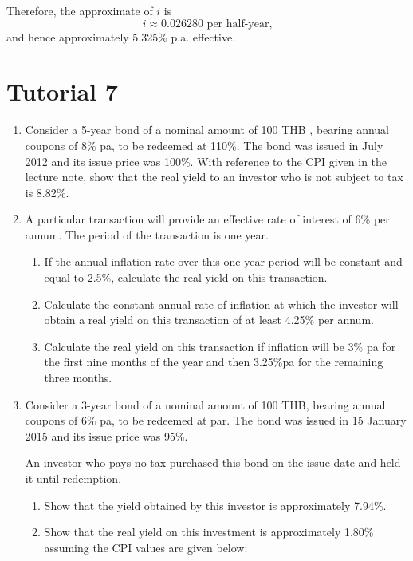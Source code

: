 \documentclass[
]{article}
\theoremstyle{definition}
\theoremstyle{definition}
\theoremstyle{definition}
\theoremstyle{definition}
\theoremstyle{remark}
\begin{document}
Therefore, the approximate of \(i\) is
\[ i \approx 0.026280 \text{ per half-year,} \] and hence
approximately 5.325\% p.a. effective.

\hypertarget{tutorial-7}{%
\section{Tutorial 7}\label{tutorial-7}}

\begin{enumerate}
\def\labelenumi{\arabic{enumi}.}
\item
  Consider a 5-year bond of a nominal amount of 100 THB , bearing annual
  coupons of 8\% pa, to be redeemed at 110\%. The bond was issued in
  July 2012 and its issue price was 100\%. With reference to the CPI
  given in the lecture note, show that the real yield to an investor
  who is not subject to tax is 8.82\%.
\item
  A particular transaction will provide an effective rate of interest
  of 6\% per annum. The period of the transaction is one year.

  \begin{enumerate}
  \def\labelenumii{\arabic{enumii}.}
  \item
    If the annual inflation rate over this one year period will be
    constant and equal to 2.5\%, calculate the real yield on this
    transaction.
  \item
    Calculate the constant annual rate of inflation at which the
    investor will obtain a real yield on this transaction of at
    least 4.25\% per annum.
  \item
    Calculate the real yield on this transaction if inflation will
    be 3\% pa for the first nine months of the year and then 3.25\%pa
    for the remaining three months.
  \end{enumerate}
\item
  Consider a 3-year bond of a nominal amount of 100 THB, bearing annual
  coupons of 6\% pa, to be redeemed at par. The bond was issued in 15
  January 2015 and its issue price was 95\%.

  An investor who pays no tax purchased this bond on the issue date
  and held it until redemption.

  \begin{enumerate}
  \def\labelenumii{\arabic{enumii}.}
  \item
    Show that the yield obtained by this investor is approximately
    7.94\%.
  \item
    Show that the real yield on this investment is approximately
    1.80\% assuming the CPI values are given below:


\end{enumerate}
\end{enumerate}
\end{document}
